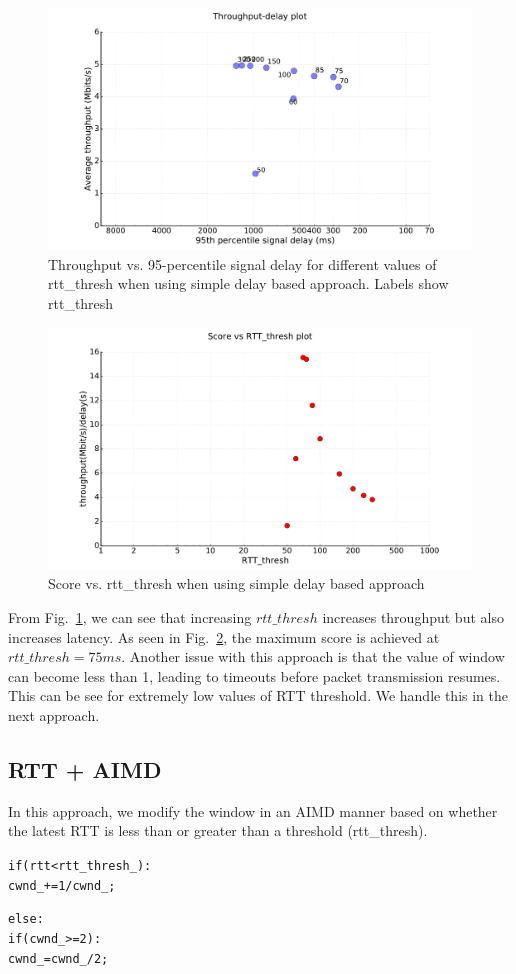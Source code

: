 \documentclass{article}
\begin{document}
\begin{figure}[h]
\includegraphics[width=\columnwidth]{"../C/simple/rtt"}
\caption{Throughput vs. 95-percentile signal delay for different
values of rtt\_thresh when using simple delay based approach. Labels
show rtt\_thresh}
\label{rtt}
\end{figure}

\begin{figure}[h]
\includegraphics[width=\columnwidth]{"../C/simple/rtt-score"}
\caption{Score vs. rtt\_thresh when using simple delay based approach}
\label{rtt-score}
\end{figure}
From Fig.~\ref{rtt}, we can see that increasing $rtt\_thresh$
increases throughput but also increases latency. As seen in
Fig.~\ref{rtt-score}, the maximum score is achieved at $rtt\_thresh =
75ms$. Another issue with this approach is that the value of window
can become less than 1, leading to timeouts before packet transmission
resumes. This can be see for extremely low values of RTT threshold. We
handle this in the next approach.

\clearpage
\subsection{RTT + AIMD}
In this approach, we modify the window in an AIMD manner based on
whether the latest RTT is less than or greater than a threshold
(rtt\_thresh).
\begin{alltt}
if (rtt < rtt_thresh_):
    cwnd_ += 1/cwnd_;

else:
    if (cwnd_ >= 2):
      cwnd_ = cwnd_/2;
\end{alltt}
\end{document}
